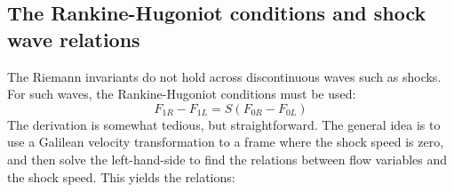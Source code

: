 \subsection{The Rankine-Hugoniot conditions and shock wave relations}
The Riemann invariants do not hold across discontinuous waves such as shocks. For such waves, the Rankine-Hugoniot conditions must be used\cite{Toro2009}:
\[{F_{1R}} - {F_{1L}} = S\left( {{F_{0R}} - {F_{0L}}} \right)\]
The derivation is somewhat tedious, but straightforward. The general idea is to use a Galilean velocity transformation to a frame where the shock speed is zero, and then solve the left-hand-side to find the relations between flow variables and the shock speed. This yields the relations:
